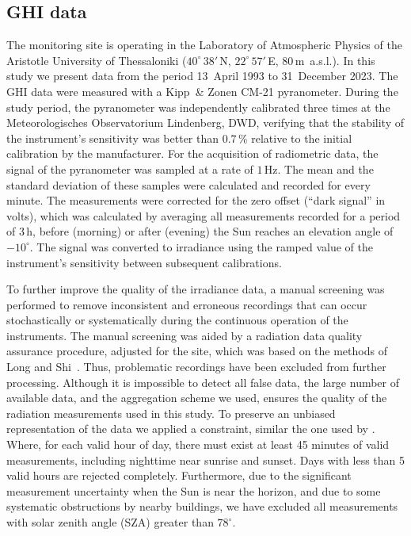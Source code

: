 \documentclass[preprint, 3p,
authoryear]{elsarticle} %
\begin{document}
\hypertarget{ghi-data}{%
\subsection{GHI data}\label{ghi-data}}

The monitoring site is operating in the Laboratory of Atmospheric
Physics of the Aristotle University of Thessaloniki
(\(40^\circ\,38'\,\)N, \(22^\circ\,57'\,\)E, \(80\,\)m~a.s.l.). In this
study we present data from the period 13~April 1993 to 31~December 2023.
The GHI data were measured with a Kipp~\& Zonen CM-21 pyranometer.
During the study period, the pyranometer was independently calibrated
three times at the Meteorologisches Observatorium Lindenberg, DWD,
verifying that the stability of the instrument's sensitivity was better
than \(0.7\,\%\) relative to the initial calibration by the
manufacturer. For the acquisition of radiometric data, the signal of the
pyranometer was sampled at a rate of \(1\,\text{Hz}\). The mean and the
standard deviation of these samples were calculated and recorded for
every minute. The measurements were corrected for the zero offset
(``dark signal'' in volts), which was calculated by averaging all
measurements recorded for a period of \(3\,\text{h}\), before (morning)
or after (evening) the Sun reaches an elevation angle of \(-10^\circ\).
The signal was converted to irradiance using the ramped value of the
instrument's sensitivity between subsequent calibrations.

To further improve the quality of the irradiance data, a manual
screening was performed to remove inconsistent and erroneous recordings
that can occur stochastically or systematically during the continuous
operation of the instruments. The manual screening was aided by a
radiation data quality assurance procedure, adjusted for the site, which
was based on the methods of Long and Shi~\citep{Long2006, Long2008a}.
Thus, problematic recordings have been excluded from further processing.
Although it is impossible to detect all false data, the large number of
available data, and the aggregation scheme we used, ensures the quality
of the radiation measurements used in this study. To preserve an
unbiased representation of the data we applied a constraint, similar the
one used by \citet{CastillejoCuberos2020}. Where, for each valid hour of
day, there must exist at least 45 minutes of valid measurements,
including nighttime near sunrise and sunset. Days with less than 5 valid
hours are rejected completely. Furthermore, due to the significant
measurement uncertainty when the Sun is near the horizon, and due to
some systematic obstructions by nearby buildings, we have excluded all
measurements with solar zenith angle (SZA) greater than \(78^\circ\).
\end{document}
